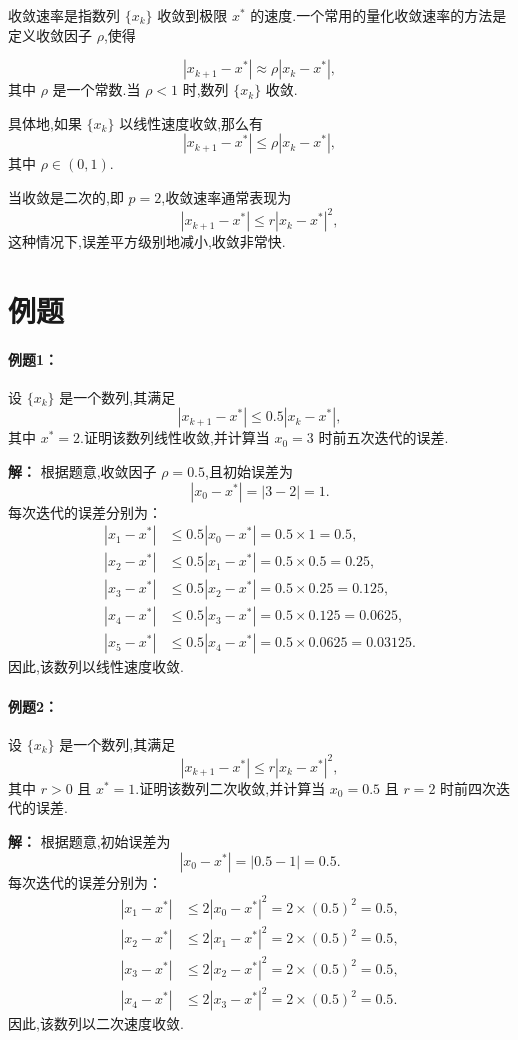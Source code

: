 收敛速率是指数列 $\{x_k\}$ 收敛到极限 $x^*$ 的速度.一个常用的量化收敛速率的方法是定义收敛因子 $\rho$,使得

\[
|x_{k+1} - x^*| \approx \rho |x_k - x^*|,
\]
其中 $\rho$ 是一个常数.当 $\rho < 1$ 时,数列 $\{x_k\}$ 收敛.

具体地,如果 $\{x_k\}$ 以线性速度收敛,那么有
\[
|x_{k+1} - x^*| \leq \rho |x_k - x^*|,
\]
其中 $\rho \in (0, 1)$.

当收敛是二次的,即 $p = 2$,收敛速率通常表现为
\[
|x_{k+1} - x^*| \leq r |x_k - x^*|^2,
\]
这种情况下,误差平方级别地减小,收敛非常快.

\section*{例题}

\paragraph{例题1：}
设 $\{x_k\}$ 是一个数列,其满足
\[
|x_{k+1} - x^*| \leq 0.5 |x_k - x^*|,
\]
其中 $x^* = 2$.证明该数列线性收敛,并计算当 $x_0 = 3$ 时前五次迭代的误差.

\textbf{解：}
根据题意,收敛因子 $\rho = 0.5$,且初始误差为
\[
|x_0 - x^*| = |3 - 2| = 1.
\]
每次迭代的误差分别为：
\[
\begin{aligned}
|x_1 - x^*| &\leq 0.5 |x_0 - x^*| = 0.5 \times 1 = 0.5, \\
|x_2 - x^*| &\leq 0.5 |x_1 - x^*| = 0.5 \times 0.5 = 0.25, \\
|x_3 - x^*| &\leq 0.5 |x_2 - x^*| = 0.5 \times 0.25 = 0.125, \\
|x_4 - x^*| &\leq 0.5 |x_3 - x^*| = 0.5 \times 0.125 = 0.0625, \\
|x_5 - x^*| &\leq 0.5 |x_4 - x^*| = 0.5 \times 0.0625 = 0.03125.
\end{aligned}
\]
因此,该数列以线性速度收敛.

\paragraph{例题2：}
设 $\{x_k\}$ 是一个数列,其满足
\[
|x_{k+1} - x^*| \leq r |x_k - x^*|^2,
\]
其中 $r > 0$ 且 $x^* = 1$.证明该数列二次收敛,并计算当 $x_0 = 0.5$ 且 $r = 2$ 时前四次迭代的误差.

\textbf{解：}
根据题意,初始误差为
\[
|x_0 - x^*| = |0.5 - 1| = 0.5.
\]
每次迭代的误差分别为：
\[
\begin{aligned}
|x_1 - x^*| &\leq 2 |x_0 - x^*|^2 = 2 \times (0.5)^2 = 0.5, \\
|x_2 - x^*| &\leq 2 |x_1 - x^*|^2 = 2 \times (0.5)^2 = 0.5, \\
|x_3 - x^*| &\leq 2 |x_2 - x^*|^2 = 2 \times (0.5)^2 = 0.5, \\
|x_4 - x^*| &\leq 2 |x_3 - x^*|^2 = 2 \times (0.5)^2 = 0.5.
\end{aligned}
\]
因此,该数列以二次速度收敛.

